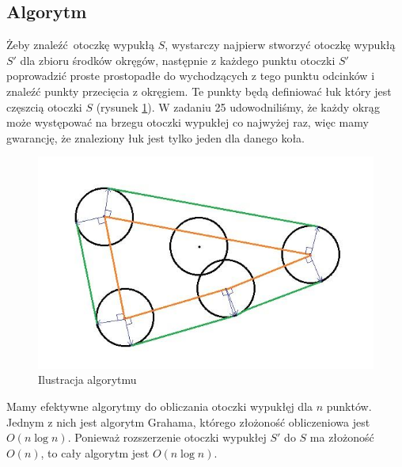 \documentclass[12pt, a4paper]{article}
\begin{document}
\subsection*{Algorytm}

Żeby znaleźć otoczkę wypukłą $S$, wystarczy najpierw stworzyć otoczkę wypukłą $S'$ dla zbioru
środków okręgów, następnie z każdego punktu otoczki $S'$ poprowadzić proste prostopadłe do wychodzących
z tego punktu odcinków i znaleźć punkty przecięcia z okręgiem. Te punkty będą definiować łuk który jest częszcią otoczki $S$ (rysunek \ref{fig:img2}).
W zadaniu 25 udowodniliśmy, że każdy okrąg może występować na brzegu otoczki wypukłej co najwyżej raz, więc mamy gwarancję, że znaleziony łuk jest tylko jeden dla danego koła.

\begin{figure}[H]
  \begin{center}
  \includegraphics[scale=0.65]{Img2}
  \caption{Ilustracja algorytmu}
  \label{fig:img2}
  \end{center}
\end{figure}

Mamy efektywne algorytmy do obliczania otoczki wypukłęj dla $n$ punktów. Jednym
z nich jest algorytm Grahama, którego złożoność obliczeniowa jest $O(n\log n)$.
Ponieważ rozszerzenie otoczki wypukłej $S'$ do $S$ ma złożoność $O(n)$, to cały algorytm jest $O(n\log n)$.
\end{document}
